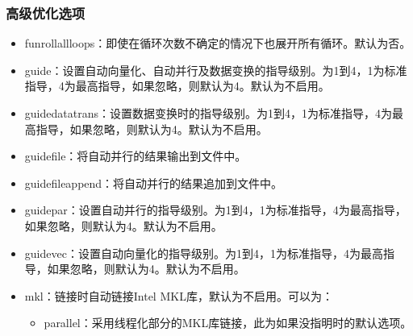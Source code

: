 \documentclass[a4paper,12pt,english]{sphinxmanual}
\begin{document}
\subsubsection{高级优化选项}
\label{\detokenize{compiler/intel:id5}}\begin{itemize}
\item {} 
\sphinxAtStartPar
\sphinxhyphen{}funroll\sphinxhyphen{}all\sphinxhyphen{}loops：即使在循环次数不确定的情况下也展开所有循环。默认为否。

\item {} 
\sphinxAtStartPar
\sphinxhyphen{}guide\sphinxstyleemphasis{{[}=n{]}}：设置自动向量化、自动并行及数据变换的指导级别。为1到4，1为标准指导，4为最高指导，如果忽略，则默认为4。默认为不启用。

\item {} 
\sphinxAtStartPar
\sphinxhyphen{}guide\sphinxhyphen{}data\sphinxhyphen{}trans\sphinxstyleemphasis{{[}=n{]}}：设置数据变换时的指导级别。为1到4，1为标准指导，4为最高指导，如果忽略，则默认为4。默认为不启用。

\item {} 
\sphinxAtStartPar
\sphinxhyphen{}guide\sphinxhyphen{}file\sphinxstyleemphasis{{[}=filename{]}}：将自动并行的结果输出到文件中。

\item {} 
\sphinxAtStartPar
\sphinxhyphen{}guide\sphinxhyphen{}file\sphinxhyphen{}append\sphinxstyleemphasis{{[}=filename{]}}：将自动并行的结果追加到文件中。

\item {} 
\sphinxAtStartPar
\sphinxhyphen{}guide\sphinxhyphen{}par\sphinxstyleemphasis{{[}=n{]}}：设置自动并行的指导级别。为1到4，1为标准指导，4为最高指导，如果忽略，则默认为4。默认为不启用。

\item {} 
\sphinxAtStartPar
\sphinxhyphen{}guide\sphinxhyphen{}vec\sphinxstyleemphasis{{[}=n{]}}：设置自动向量化的指导级别。为1到4，1为标准指导，4为最高指导，如果忽略，则默认为4。默认为不启用。

\item {} 
\sphinxAtStartPar
\sphinxhyphen{}mkl\sphinxstyleemphasis{{[}=lib{]}}：链接时自动链接Intel MKL库，默认为不启用。可以为：
\begin{itemize}
\item {} 
\sphinxAtStartPar
parallel：采用线程化部分的MKL库链接，此为如果没指明时的默认选项。


\end{itemize}
\end{itemize}
\end{document}
